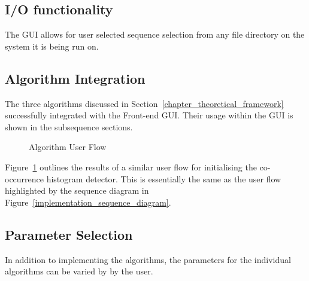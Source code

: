 \subsection{I/O functionality}
The GUI allows for user selected sequence selection from any file directory on
the system it is being run on.

\subsection{Algorithm Integration}
The three algorithms discussed in Section~\ref{chapter_theoretical_framework}
successfully integrated with the Front-end GUI. Their usage within the GUI is
shown in the subsequence sections.

\begin{figure}
    \caption{Algorithm User Flow\label{fig:gui_CHD}}
\end{figure}

Figure~\ref{fig:gui_CHD} outlines the results of a similar user flow for
initialising the co-occurrence histogram detector. This is essentially the same
as the user flow highlighted by the sequence diagram in Figure~\ref{implementation_sequence_diagram}. 

\subsection{Parameter Selection}
In addition to implementing the algorithms, the parameters for the individual
algorithms can be varied by by the user.


